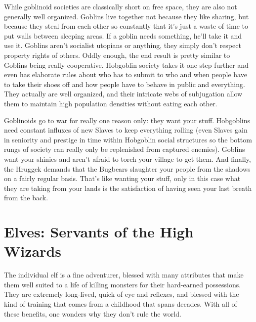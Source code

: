 While goblinoid societies are classically short on free space, they are also not generally well organized. Goblins live together not because they like sharing, but because they steal from each other so constantly that it's just a waste of time to put walls between sleeping areas. If a goblin needs something, he'll take it and use it. Goblins aren't socialist utopians or anything, they simply don't respect property rights of others. Oddly enough, the end result is pretty similar to Goblins being really cooperative. Hobgoblin society takes it one step further and even has elaborate rules about who has to submit to who and when people have to take their shoes off and how people have to behave in public and everything. They actually are well organized, and their intricate webs of subjugation allow them to maintain high population densities without eating each other.

Goblinoids go to war for really one reason only: they want your stuff. Hobgoblins need constant influxes of new Slaves to keep everything rolling (even Slaves gain in seniority and prestige in time within Hobgoblin social structures so the bottom rungs of society can really only be replenished from captured enemies). Goblins want your shinies and aren't afraid to torch your village to get them. And finally, the Hruggek demands that the Bugbears slaughter your people from the shadows on a fairly regular basis. That's like wanting your stuff, only in this case what they are taking from your lands is the satisfaction of having seen your last breath from the back.

\section{Elves: Servants of the High Wizards}

The individual elf is a fine adventurer, blessed with many attributes that make them well suited to a life of killing monsters for their hard-earned possessions. They are extremely long-lived, quick of eye and reflexes, and blessed with the kind of training that comes from a childhood that spans decades. With all of these benefits, one wonders why they don't rule the world.

